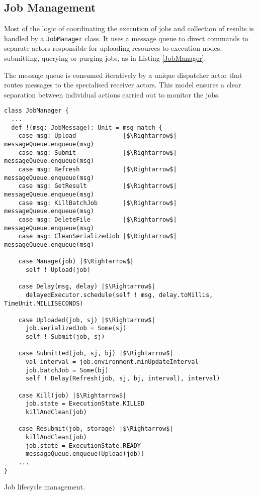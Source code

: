 \subsection{Job Management}

Most of the logic of coordinating the execution of jobs and collection of results is handled by a \verb|JobManager| class. It uses a message queue to direct commands to separate actors responsible for uploading resources to execution nodes, submitting, querying or purging jobs, as in Listing \ref{JobManager}. 

The message queue is consumed iteratively by a unique dispatcher actor that routes messages to the specialised receiver actors. This model ensures a clear separation between individual actions carried out to monitor the jobs.

\begin{listing}[h]
	\centering
	\begin{minipage}{13.8cm}
		\begin{verbatim}
class JobManager {
  ...
  def !(msg: JobMessage): Unit = msg match {
    case msg: Upload             |$\Rightarrow$| messageQueue.enqueue(msg)
    case msg: Submit             |$\Rightarrow$| messageQueue.enqueue(msg)
    case msg: Refresh            |$\Rightarrow$| messageQueue.enqueue(msg)
    case msg: GetResult          |$\Rightarrow$| messageQueue.enqueue(msg)
    case msg: KillBatchJob       |$\Rightarrow$| messageQueue.enqueue(msg)
    case msg: DeleteFile         |$\Rightarrow$| messageQueue.enqueue(msg)
    case msg: CleanSerializedJob |$\Rightarrow$| messageQueue.enqueue(msg)
    
    case Manage(job) |$\Rightarrow$|
      self ! Upload(job)
      
    case Delay(msg, delay) |$\Rightarrow$|
      delayedExecutor.schedule(self ! msg, delay.toMillis, TimeUnit.MILLISECONDS)
      
    case Uploaded(job, sj) |$\Rightarrow$|
      job.serializedJob = Some(sj)
      self ! Submit(job, sj)
      
    case Submitted(job, sj, bj) |$\Rightarrow$|
      val interval = job.environment.minUpdateInterval
      job.batchJob = Some(bj)
      self ! Delay(Refresh(job, sj, bj, interval), interval)
      
    case Kill(job) |$\Rightarrow$|
      job.state = ExecutionState.KILLED
      killAndClean(job)
      
    case Resubmit(job, storage) |$\Rightarrow$|
      killAndClean(job)
      job.state = ExecutionState.READY
      messageQueue.enqueue(Upload(job))      
    ...
}
		\end{verbatim}
	\end{minipage}
	\caption{Job lifecycle management.}
	\label{JobManager}
\end{listing}

